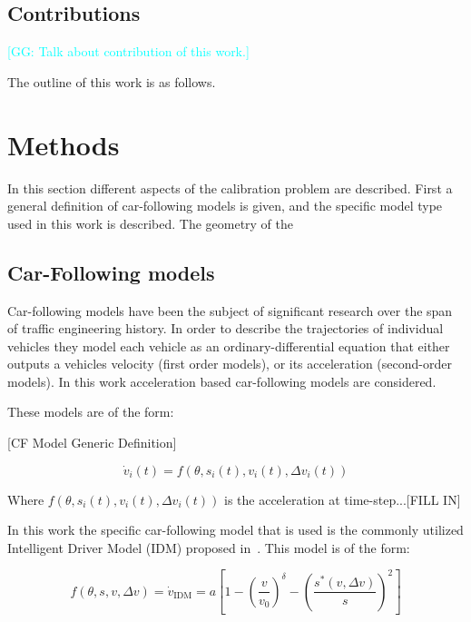 \documentclass[english,titlepage,oneside,12pt]{article}
\newcommand{\kibitz}[2]{\ifnum\Comments=0\textcolor{#1}{#2}\fi}
\newcommand{\George}[1]{\kibitz{cyan}      {[GG: #1]}}
\begin{document}
\subsection{Contributions}\label{sec:Contributions}

\George{Talk about contribution of this work.}

The outline of this work is as follows.

\section{Methods}\label{Methods}

In this section different aspects of the calibration problem are described. First a general definition of car-following models is given, and the specific model type used in this work is described. The geometry of the 


\subsection{Car-Following models}
Car-following models have been the subject of significant research over the span of traffic engineering history. In order to describe the trajectories of individual vehicles they model each vehicle as an ordinary-differential equation that either outputs a vehicles velocity (first order models), or its acceleration (second-order models). In this work acceleration based car-following models are considered.

These models are of the form:

[CF Model Generic Definition]

\begin{equation}\label{eq:cfmodel}
    \dot{v}_{i}(t) = f(\theta,s_{i}(t), v_{i}(t), \Delta v_{i}(t))
\end{equation}

Where $f(\theta,s_{i}(t), v_{i}(t), \Delta v_{i}(t))$ is the acceleration at time-step...[FILL IN]

In this work the specific car-following model that is used is the commonly utilized Intelligent Driver Model (IDM) proposed in~\cite{Treiber_IDM}. This model is of the form:

\begin{equation}\label{eq:IDM_Equation}
    f(\theta,s,v,\Delta v) = \dot{v}_{\text{IDM}}=a\left[1-\left(\frac{v}{v_{0}}\right)^{\delta}-\left(\frac{s^{*}\left(v,\Delta v\right)}{s}\right)^{2}\right]
\end{equation}
\end{document}
